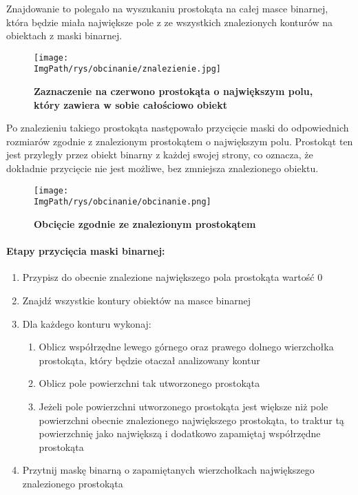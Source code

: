 \documentclass[a4paper,12pt,twoside,openany]{report}
\newcommand{\ImgPath}{.}
\begin{document}
Znajdowanie to polegało na wyszukaniu prostokąta na całej masce binarnej, która będzie miała największe pole z ze wszystkich znalezionych konturów na obiektach z maski binarnej. 

\begin{figure}[H]
	\centering
	{\label{fig:a}\texttt{[image: \\ImgPath/rys/obcinanie/znalezienie.jpg]}}
	\caption{  \textbf{Zaznaczenie na czerwono prostokąta o największym polu, który zawiera w sobie całościowo obiekt}}
\end{figure}

Po znalezieniu takiego prostokąta następowało przycięcie maski do odpowiednich rozmiarów zgodnie z znalezionym prostokątem o największym polu. Prostokąt ten jest przyległy przez obiekt binarny z każdej swojej strony, co oznacza, że dokładnie przycięcie nie jest możliwe, bez zmniejsza znalezionego obiektu.

\begin{figure}[H]
	\centering
	{\label{fig:b}\texttt{[image: \\ImgPath/rys/obcinanie/obcinanie.png]}}
	\caption{  \textbf{Obcięcie zgodnie ze znalezionym prostokątem}}
\end{figure}
\paragraph{Etapy przycięcia maski binarnej:}
\begin{enumerate}
	\item Przypisz do obecnie znalezione największego pola prostokąta wartość 0
	\item Znajdź wszystkie kontury obiektów na masce binarnej
	\item Dla każdego konturu wykonaj:
	\begin{enumerate}
		\item Oblicz współrzędne lewego górnego oraz prawego dolnego wierzchołka prostokąta, który będzie otaczał analizowany kontur 
		\item Oblicz pole powierzchni tak utworzonego prostokąta
		\item Jeżeli pole powierzchni utworzonego prostokąta jest większe niż pole powierzchni obecnie znalezionego największego prostokąta, to traktur tą powierzchnię jako największą i dodatkowo zapamiętaj współrzędne prostokąta
	\end{enumerate}
	\item Przytnij maskę binarną o zapamiętanych wierzchołkach największego znalezionego prostokąta
\end{enumerate}
\end{document}
